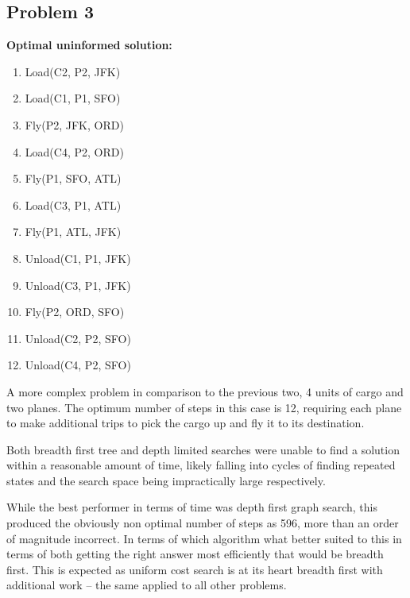 \documentclass[11pt]{article}
\begin{document}
\subsection{Problem 3}

\textbf{Optimal uninformed solution:}
\begin{enumerate}
	\item Load(C2, P2, JFK)
	\item Load(C1, P1, SFO)
	\item Fly(P2, JFK, ORD)
	\item Load(C4, P2, ORD)
	\item Fly(P1, SFO, ATL)
	\item Load(C3, P1, ATL)
	\item Fly(P1, ATL, JFK)
	\item Unload(C1, P1, JFK)
	\item Unload(C3, P1, JFK)
	\item Fly(P2, ORD, SFO)
	\item Unload(C2, P2, SFO)
	\item Unload(C4, P2, SFO)
\end{enumerate}

A more complex problem in comparison to the previous two, 4 units of cargo and two planes. The optimum number of steps in this case is 12, requiring each plane to make additional trips to pick the cargo up and fly it to its destination.

Both breadth first tree and depth limited searches were unable to find a solution within a reasonable amount of time, likely falling into cycles of finding repeated states and the search space being impractically large respectively.

While the best performer in terms of time was depth first graph search, this produced the obviously non optimal number of steps as 596, more than an order of magnitude incorrect. In terms of which algorithm what better suited to this in terms of both getting the right answer most efficiently that would be breadth first. This is expected as uniform cost search is at its heart breadth first with additional work -- the same applied to all other problems.
\end{document}

